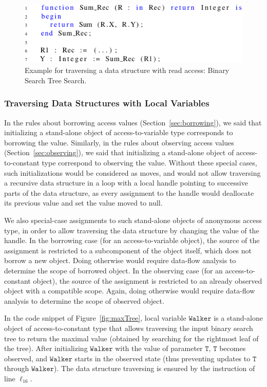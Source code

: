 \documentclass{llncs}
\newcommand\var[1]{\ensuremath{\mathtt{#1}}}
\begin{document}
\begin{figure}[htb!]
\centering
  \captionsetup{justification=centering,margin=0.6cm}
   \includegraphics[]{observingComposite}
   \caption{Example for traversing a data structure with read access: Binary Search Tree Search.}
   \label{fig:observingComposite}
\end{figure}



\subsubsection{Traversing Data Structures with Local Variables}

In the rules about borrowing access values (Section~\ref{sec:borrowing}), we said that initializing a stand-alone object of access-to-variable type corresponds to
borrowing the value. Similarly, in the rules about observing access values (Section~\ref{sec:observing}), we said that initializing a stand-alone object of
access-to-constant type correspond to observing the value. Without these special cases, such initializations would be considered as moves, and would not allow
traversing a recursive data structure in a loop with a local handle pointing to successive parts of the data structure, as every assignment to the handle would
deallocate its previous value and set the value moved to null.

We also special-case assignments to such stand-alone objects of anonymous access type, in order to allow traversing the data structure by changing the value of the handle.
In the borrowing case (for an access-to-variable object), the source of the assignment is restricted to a subcomponent of the object itself, which does not borrow a new object.
Doing otherwise would require data-flow analysis to determine the scope of borrowed object. In the observing case (for an access-to-constant object), the source of
the assignment is restricted to an already observed object with a compatible scope. Again, doing otherwise would require data-flow analysis to determine the scope of observed object.

In the code snippet of Figure~\ref{fig:maxTree}, local variable \var{Walker} is a stand-alone object of access-to-constant type that allows traversing the input binary
search tree to return the maximal value (obtained by searching for the rightmost leaf of the tree). After initializing \var{Walker} with the value of parameter \var{T},
\var{T} becomes observed, and \var{Walker} starts in the observed state (thus preventing updates to \var{T} through \var{Walker}). The data structure traversing is ensured by the instruction
of line $\ell_{16}$. 
\end{document}
